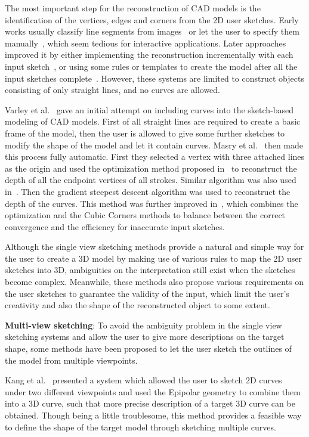 The most important step for the reconstruction  of CAD models is the
identification of the vertices, edges and corners from the 2D user
sketches. Early works usually classify line segments from
images~\cite{MJ86} or let the user to specify them
manually~\cite{PD92}, which seem tedious for interactive
applications. Later approaches improved it by either implementing
the reconstruction incrementally with each input
sketch~\cite{CNJC03}, or using some rules or templates to create the
model after all the input sketches complete~\cite{FBSS04,VMS05}.
However, these systems are limited to construct objects consisting
of only straight lines, and no curves are allowed.

Varley et al.~\cite{PYJH04} gave an initial  attempt on including
curves into the sketch-based modeling of CAD models. First of all
straight lines are required to create a basic frame of the model,
then the user is allowed to give some further sketches to modify the
shape of the model and let it contain curves. Masry et
al.~\cite{ML07} then made this process fully automatic. First they
selected a vertex with three attached lines as the origin and used
the optimization method proposed in~\cite{KML04} to reconstruct the
depth of all the endpoint vertices of all strokes. Similar algorithm
was also used in~\cite{CCCP04}. Then the gradient steepest descent
algorithm was used to reconstruct the depth of the curves. This
method was further improved in~\cite{LF12}, which combines the
optimization and the Cubic Corners methods to balance between the
correct convergence and the efficiency for inaccurate input
sketches.

Although the single view sketching methods  provide a natural and
simple way for the user to create a 3D model by making use of
various rules to map the 2D user sketches into 3D, ambiguities on
the interpretation still exist when the sketches become complex.
Meanwhile, these methods also propose various requirements on the
user sketches to guarantee the validity of the input, which limit
the user's creativity and also the shape of the reconstructed object
to some extent.


\textbf{Multi-view sketching}: To avoid the  ambiguity problem in
the single view sketching systems and allow the user to give more
descriptions on the target shape, some methods have been proposed to
let the user sketch the outlines of the model from multiple
viewpoints.

Kang et al.~\cite{KMR04} presented a system  which allowed the user
to sketch 2D curves under two different viewpoints and used the
Epipolar geometry to combine them into a 3D curve, such that more
precise description of a target 3D curve can be obtained. Though
being a little troublesome, this method provides a feasible way to
define the shape of the target model through sketching multiple
curves.

